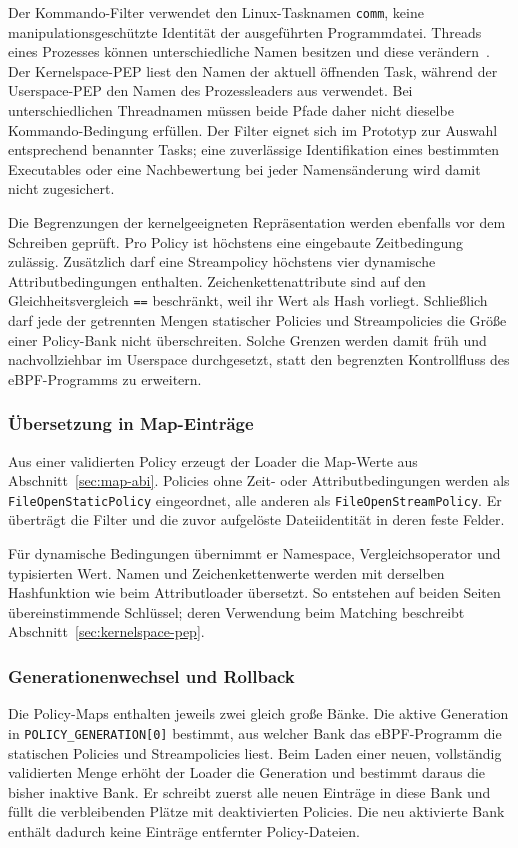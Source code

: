 Der Kommando-Filter verwendet den Linux-Tasknamen \texttt{comm}, keine manipulationsgeschützte Identität der ausgeführten Programmdatei. Threads eines Prozesses können unterschiedliche Namen besitzen und diese verändern~\citep{manProcPidComm}. Der Kernelspace-PEP liest den Namen der aktuell öffnenden Task, während der Userspace-PEP den Namen des Prozessleaders aus  verwendet. Bei unterschiedlichen Threadnamen müssen beide Pfade daher nicht dieselbe Kommando-Bedingung erfüllen. Der Filter eignet sich im Prototyp zur Auswahl entsprechend benannter Tasks; eine zuverlässige Identifikation eines bestimmten Executables oder eine Nachbewertung bei jeder Namensänderung wird damit nicht zugesichert.

Die Begrenzungen der kernelgeeigneten Repräsentation werden ebenfalls vor dem Schreiben geprüft. Pro Policy ist höchstens eine eingebaute Zeitbedingung zulässig. Zusätzlich darf eine Streampolicy höchstens vier dynamische Attributbedingungen enthalten. Zeichenkettenattribute sind auf den Gleichheitsvergleich \texttt{==} beschränkt, weil ihr Wert als Hash vorliegt. Schließlich darf jede der getrennten Mengen statischer Policies und Streampolicies die Größe einer Policy-Bank nicht überschreiten. Solche Grenzen werden damit früh und nachvollziehbar im Userspace durchgesetzt, statt den begrenzten Kontrollfluss des eBPF-Programms zu erweitern.

\subsubsection{Übersetzung in Map-Einträge}
Aus einer validierten Policy erzeugt der Loader die Map-Werte aus Abschnitt~\ref{sec:map-abi}. Policies ohne Zeit- oder Attributbedingungen werden als \texttt{FileOpenStaticPolicy} eingeordnet, alle anderen als \texttt{FileOpenStreamPolicy}. Er überträgt die Filter und die zuvor aufgelöste Dateiidentität in deren feste Felder.

Für dynamische Bedingungen übernimmt er Namespace, Vergleichsoperator und typisierten Wert. Namen und Zeichenkettenwerte werden mit derselben Hashfunktion wie beim Attributloader übersetzt. So entstehen auf beiden Seiten übereinstimmende Schlüssel; deren Verwendung beim Matching beschreibt Abschnitt~\ref{sec:kernelspace-pep}.

\subsubsection{Generationenwechsel und Rollback}\label{sec:policy-generation}
Die Policy-Maps enthalten jeweils zwei gleich große Bänke. Die aktive Generation in \texttt{POLICY\_GENERATION[0]} bestimmt, aus welcher Bank das eBPF-Programm die statischen Policies und Streampolicies liest. Beim Laden einer neuen, vollständig validierten Menge erhöht der Loader die Generation und bestimmt daraus die bisher inaktive Bank. Er schreibt zuerst alle neuen Einträge in diese Bank und füllt die verbleibenden Plätze mit deaktivierten Policies. Die neu aktivierte Bank enthält dadurch keine Einträge entfernter Policy-Dateien.

